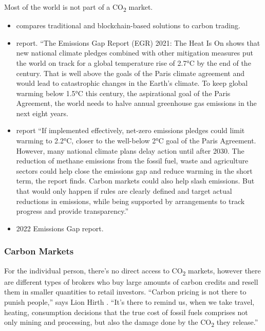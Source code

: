 \documentclass[
  letterpaper,
  DIV=11,
  numbers=noendperiod]{scrartcl}
\providecommand{\tightlist}{%
  \setlength{\itemsep}{0pt}\setlength{\parskip}{0pt}}\usepackage{longtable,booktabs,array}
\begin{document}
Most of the world is not part of a CO\textsubscript{2} market.

\begin{itemize}
\tightlist
\item
  \citep{sipthorpeBlockchainSolutionsCarbon2022} compares traditional
  and blockchain-based solutions to carbon trading.
\item
  \citep{unitednationsenvironmentprogrammeunepEmissionsGapReport2021}
  report. ``The Emissions Gap Report (EGR) 2021: The Heat Is On shows
  that new national climate pledges combined with other mitigation
  measures put the world on track for a global temperature rise of 2.7°C
  by the end of the century. That is well above the goals of the Paris
  climate agreement and would lead to catastrophic changes in the
  Earth's climate. To keep global warming below 1.5°C this century, the
  aspirational goal of the Paris Agreement, the world needs to halve
  annual greenhouse gas emissions in the next eight years.
\item
  \citep{unitednationsenvironmentprogrammeunepEmissionsGapReport2021}
  report ``If implemented effectively, net-zero emissions pledges could
  limit warming to 2.2°C, closer to the well-below 2°C goal of the Paris
  Agreement. However, many national climate plans delay action until
  after 2030. The reduction of methane emissions from the fossil fuel,
  waste and agriculture sectors could help close the emissions gap and
  reduce warming in the short term, the report finds. Carbon markets
  could also help slash emissions. But that would only happen if rules
  are clearly defined and target actual reductions in emissions, while
  being supported by arrangements to track progress and provide
  transparency.''
\item
  \citep{unitednationsenvironmentprogrammeEmissionsGapReport2022} 2022
  Emissions Gap report.
\end{itemize}

\subsubsection{Carbon Markets}\label{carbon-markets}

For the individual person, there's no direct access to
CO\textsubscript{2} markets, however there are different types of
brokers who buy large amounts of carbon credits and resell them in
smaller quantities to retail investors. ``Carbon pricing is not there to
punish people,'' says Lion Hirth \citet{lionhirthLionHirthTwitter}.
``It's there to remind us, when we take travel, heating, consumption
decisions that the true cost of fossil fuels comprises not only mining
and processing, but also the damage done by the CO\textsubscript{2} they
release.''
\end{document}
